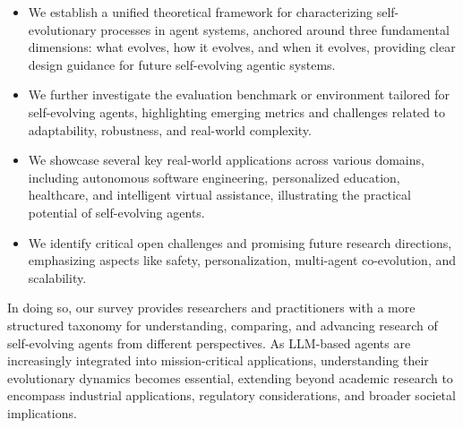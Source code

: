 \begin{itemize}
    \item We establish a unified theoretical framework for characterizing self-evolutionary processes in agent systems, anchored around three fundamental dimensions: what evolves, how it evolves, and when it evolves, providing clear design guidance for future self-evolving agentic systems.

    \item We further investigate the evaluation benchmark or environment tailored for self-evolving agents, highlighting emerging metrics and challenges related to adaptability, robustness, and real-world complexity.

    \item We showcase several key real-world applications across various domains, including autonomous software engineering, personalized education, healthcare, and intelligent virtual assistance, illustrating the practical potential of self-evolving agents.

    \item We identify critical open challenges and promising future research directions, emphasizing aspects like safety, personalization, multi-agent co-evolution, and scalability.


\end{itemize}

In doing so, our survey provides researchers and practitioners with a more structured taxonomy for understanding, comparing, and advancing research of self-evolving agents from different perspectives. As LLM-based agents are increasingly integrated into mission-critical applications, understanding their evolutionary dynamics becomes essential, extending beyond academic research to encompass industrial applications, regulatory considerations, and broader societal implications.



